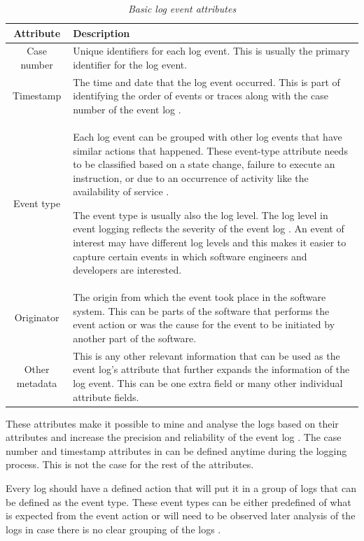 \begin{table}[!htb]
	\centering
	\caption[Basic log event attributes]
	{\textit{Basic log event attributes \cite{Bekeneva2020}}}
	\label{tbl:ch1_logBasicAttributes}
	\begin{tabularx}{\textwidth}{|c|X|}
		\hline \textbf{Attribute} & \textbf{Description} \\
		\hline Case number & Unique identifiers for each log event. This is usually the primary identifier for the log event. \\
		\hline Timestamp & The time and date that the log event occurred. This is part of identifying the order of events or traces along with the case number of the event log \cite{Kherbouche2017}. \\
		\hline Event type & Each log event can be grouped with other log events that have similar actions that happened. These event-type attribute needs to be classified based on a state change, failure to execute an instruction, or due to an occurrence of activity like the availability of service \cite{Fedaghi2010}. \par The event type is usually also the log level. The log level in event logging reflects the severity of the event log \cite{Rong2020}. An event of interest may have different log levels and this makes it easier to capture certain events in which software engineers and developers are interested.\\
		\hline Originator & The origin from which the event took place in the software system. This can be parts of the software that performs the event action or was the cause for the event to be initiated by another part of the software. \\
		\hline Other metadata & This is any other relevant information that can be used as the event log's attribute that further expands the information of the log event. This can be one extra field or many other individual attribute fields.\\
		\hline
	\end{tabularx}
\end{table}

These attributes make it possible to mine and analyse the logs based on their attributes and increase the precision and reliability of the event log \cite{Kherbouche2017}. The case number and timestamp attributes in  can be defined anytime during the logging process. This is not the case for the rest of the attributes.\par Every log should have a defined action that will put it in a group of logs that can be defined as the event type. These event types can be either predefined of what is expected from the event action or will need to be observed later analysis of the logs in case there is no clear grouping of the logs \cite{Bekeneva2020, Fedaghi2010}.

